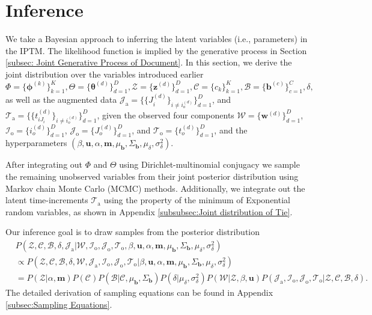\documentclass[a4paper]{article}
\begin{document}
\section{Inference} \label{sec: Inference}		
We take a Bayesian approach to inferring the latent variables (i.e., parameters) in the IPTM. The likelihood function is implied by the generative process in Section \ref{subsec: Joint Generative Process of Document}. In this section, we derive the joint distribution over the variables introduced earlier $\Phi=\{\boldsymbol{\phi}^{(k)}\}_{k=1}^{K}, \Theta=\{\boldsymbol{\theta}^{(d)} \}_{d=1}^{D},\mathcal{Z}=\{\boldsymbol{z}^{(d)} \}_{d=1}^{D}, \mathcal{C}=\{{c}_k \}_{k=1}^{K}, \mathcal{B}=\{\boldsymbol{b}^{(c)} \}_{c=1}^{C}, \delta,$ as well as the augmented data $\mathcal{J}_{\mbox{a}}=\{\{J_i^{(d)}\}_{i\neq i_o^{(d)}}\}_{d=1}^D$, and $\mathcal{T}_{\mbox{a}}=\{\{t_{iJ_i}^{(d)}\}_{i\neq i_o^{(d)}}\}_{d=1}^D$, given the observed four components $\mathcal{W}=\{\boldsymbol{w}^{(d)} \}_{d=1}^{D}$, $\mathcal{I}_{\mbox{o}}=\{i_o^{(d)}\}_{d=1}^D$,  $\mathcal{J}_{\mbox{o}}=\{J_o^{(d)}\}_{d=1}^D$, and $\mathcal{T}_{\mbox{o}}= \{t_o^{(d)}\}_{d=1}^D$, and the hyperparameters $(\beta, \boldsymbol{u}, \alpha, \boldsymbol{m}, \mu_{\boldsymbol{b}}, \Sigma_{\boldsymbol{b}}, \mu_\delta, \sigma^2_\delta)$.
	
After integrating out $\Phi$ and $\Theta$ using Dirichlet-multinomial conjugacy \citep{griffiths2004finding} we sample the remaining unobserved variables from their joint posterior distribution using Markov chain Monte Carlo (MCMC) methods. Additionally, we integrate out the latent time-increments $\mathcal{T}_{\mbox{a}}$ using the property of the minimum of Exponential random variables, as shown in Appendix \ref{subsubsec:Joint distribution of Tie}. 

Our inference goal is to draw samples from the posterior distribution
	  \begin{equation}
	  \begin{aligned}
	  &P(\mathcal{Z}, \mathcal{C}, \mathcal{B}, \delta, \mathcal{J}_{\mbox{a}}|\mathcal{W}, \mathcal{I}_{\mbox{o}}, \mathcal{J}_{\mbox{o}}, \mathcal{T}_{\mbox{o}}, \beta, \boldsymbol{u}, \alpha, \boldsymbol{m}, \mu_{\boldsymbol{b}}, \Sigma_{\boldsymbol{b}}, \mu_\delta, \sigma^2_\delta) \\
	  &\propto 	P(\mathcal{Z}, \mathcal{C}, \mathcal{B}, \delta, \mathcal{W}, \mathcal{J}_{\mbox{a}}, \mathcal{I}_{\mbox{o}}, \mathcal{J}_{\mbox{o}}, \mathcal{T}_{\mbox{o}} |\beta, \boldsymbol{u}, \alpha, \boldsymbol{m}, \mu_{\boldsymbol{b}}, \Sigma_{\boldsymbol{b}}, \mu_\delta, \sigma^2_\delta)\\&  = P(\mathcal{Z}|\alpha, \boldsymbol{m})P(\mathcal{C})P(\mathcal{B}|\mathcal{C}, \mu_{\boldsymbol{b}}, \Sigma_{\boldsymbol{b}})P(\delta | \mu_\delta, \sigma^2_\delta) P(\mathcal{W}|\mathcal{Z}, \beta, \boldsymbol{u})P(\mathcal{J}_{\mbox{a}}, \mathcal{I}_{\mbox{o}}, \mathcal{J}_{\mbox{o}}, \mathcal{T}_{\mbox{o}} |\mathcal{Z}, \mathcal{C}, \mathcal{B}, \delta).
	  \end{aligned}
	  	\label{alg:jointposterior}
	  \end{equation}
	 The detailed derivation of sampling equations can be found in Appendix \ref{subsec:Sampling Equations}. 
	  
\end{document}

